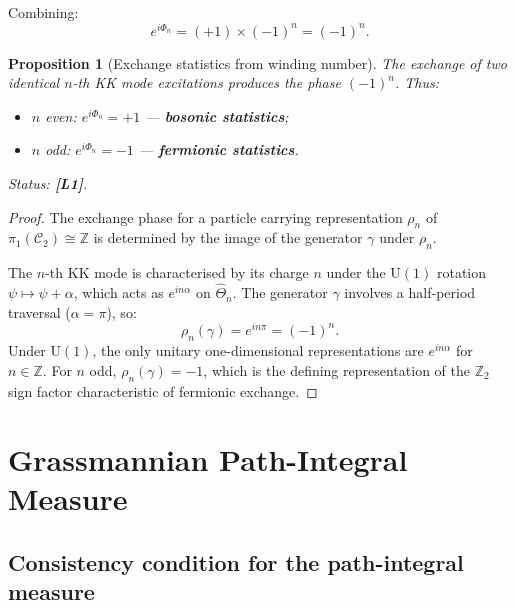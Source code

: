 \documentclass[11pt,a4paper]{article}
\newtheorem{proposition}{Proposition}
\newcommand{\Lone}{\textbf{[L1]}}
\begin{document}
Combining:
\begin{equation}
\label{eq:total_phase}
  e^{i\Phi_n} = (+1)\times(-1)^n = (-1)^n.
\end{equation}

\begin{proposition}[Exchange statistics from winding number]\label{prop:exchange}
  The exchange of two identical $n$-th KK mode excitations produces the phase
  $(-1)^n$.  Thus:
  \begin{itemize}
    \item $n$ even: $e^{i\Phi_n} = +1$ — \textbf{bosonic statistics};
    \item $n$ odd: $e^{i\Phi_n} = -1$ — \textbf{fermionic statistics}.
  \end{itemize}
  Status: \Lone{}.
\end{proposition}

\begin{proof}
  The exchange phase for a particle carrying representation $\rho_n$ of
  $\pi_1(\mathcal{C}_2)\cong\mathbb{Z}$ is determined by the image of the
  generator $\gamma$ under $\rho_n$.
  
  The $n$-th KK mode is characterised by its charge $n$ under the $\mathrm{U}(1)$
  rotation $\psi\mapsto\psi+\alpha$, which acts as $e^{in\alpha}$ on $\hat\Theta_n$.
  The generator $\gamma$ involves a half-period traversal ($\alpha=\pi$), so:
  \begin{equation}
    \rho_n(\gamma) = e^{in\pi} = (-1)^n.
  \end{equation}
  Under $\mathrm{U}(1)$, the only unitary one-dimensional representations are
  $e^{in\alpha}$ for $n\in\mathbb{Z}$.  For $n$ odd, $\rho_n(\gamma)=-1$,
  which is the defining representation of the $\mathbb{Z}_2$ sign factor
  characteristic of fermionic exchange.
\end{proof}

\section{Grassmannian Path-Integral Measure}
\label{sec:grassmann}

\subsection{Consistency condition for the path-integral measure}
\end{document}
